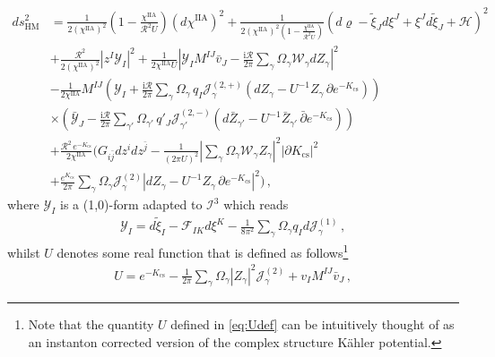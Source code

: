 \begin{align}\label{eq:quantumhypermetric}
	\nonumber d s^2_{\text{HM}} &= \frac{1}{2\left(\chi^{\text{IIA}}\right)^2} \left( 1-\frac{\chi^{\text{IIA}}}{\mathcal{R}^2 U}\right)(d \chi^{\text{IIA}})^2 + \frac{1}{2 \left(\chi^{\text{IIA}}\right)^2\left( 1-\frac{\chi^{\text{IIA}}}{\mathcal{R}^2 U}\right)} \left( d \varrho - \tilde{\xi}_J d\xi^J+\xi^J d\tilde{\xi}_J + \mathcal{H} \right)^2\\
	\nonumber  &+\frac{\mathcal{R}^2}{2 \left(\chi^{\text{IIA}}\right)^2} \left| z^I \mathcal{Y}_I\right|^2 + \frac{1}{2 \chi^{\text{IIA}} U} \left| \mathcal{Y}_I M^{IJ} \bar{v}_J - \frac{\text{i} \mathcal{R}}{2\pi} \sum_{\gamma} \Omega_{\gamma} \mathcal{W}_{\gamma} d Z_{\gamma}\right|^2\\
	\nonumber &-\frac{1}{2 \chi^{\text{IIA}}} M^{IJ} \left( \mathcal{Y}_I + \frac{\text{i} \mathcal{R}}{2\pi} \sum_{\gamma} \Omega_{\gamma}\, q_I \mathcal{J}_{\gamma}^{(2, +)} \left( d Z_{\gamma}-U^{-1} Z_{\gamma}\, \partial e^{-K_{\text{cs}}}\right)\right)\\
	\nonumber &\times \left( \bar{\mathcal{Y}}_J - \frac{\text{i} \mathcal{R}}{2\pi} \sum_{\gamma'} \Omega_{\gamma'}\, q'_J \mathcal{J}_{\gamma'}^{(2, -)} \left( d \bar{Z}_{\gamma'}-U^{-1} \bar{Z}_{\gamma'}\, \bar{\partial} e^{-K_{\text{cs}}}\right)\right)\\
	\nonumber &+\frac{\mathcal{R}^2\, e^{-K_{\text{cs}}}}{2 \chi^{\text{IIA}}} \Bigg( G_{i \bar j} d z^i d z^{\bar j} - \frac{1}{\left( 2\pi U\right)^2} \left|  \sum_{\gamma} \Omega_{\gamma} \mathcal{W}_{\gamma} Z_{\gamma} \right|^2 \left| \partial K_{\text{cs}}\right|^2\\
	&+\frac{e^{K_{\text{cs}}}}{2\pi} \sum_{\gamma} \Omega_{\gamma} \mathcal{J}_{\gamma}^{(2)}\left| d Z_{\gamma}-U^{-1} Z_{\gamma}\, \partial e^{-K_{\text{cs}}}\right|^2\Bigg)\, ,
\end{align}
%
where $\mathcal{Y}_I$ is a (1,0)-form adapted to $\mathcal{I}^3$ which reads
%
\begin{align}\label{eq:holomorphic1formJ3}
	\mathcal{Y}_I= d\tilde{\xi}_I -\mathcal{F}_{IK} d\xi^K - \frac{1}{8\pi^2} \sum_{\gamma} \Omega_{\gamma} q_I d \mathcal{J}_{\gamma}^{(1)}\, ,
\end{align}
%
whilst $U$ denotes some real function that is defined as follows\footnote{Note that the quantity $U$ defined in \eqref{eq:Udef} can be intuitively thought of as an instanton corrected version of the complex structure K\"ahler potential.}
%
\begin{align}\label{eq:Udef}
	U= e^{-K_{\text{cs}}} - \frac{1}{2\pi} \sum_{\gamma} \Omega_{\gamma} \left| Z_{\gamma}\right|^2\mathcal{J}_{\gamma}^{(2)} + v_I M^{IJ} \bar{v}_J\, ,
\end{align}
